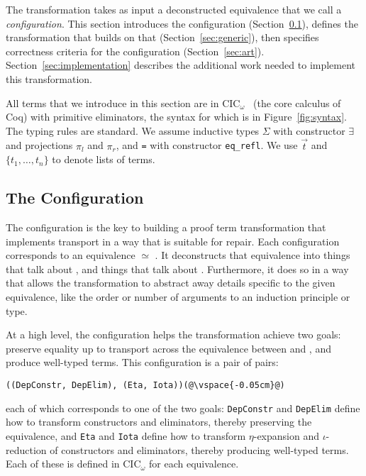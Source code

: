 
The transformation takes as input a deconstructed equivalence that we call a \textit{configuration}.
This section introduces the configuration (Section~\ref{sec:configurable}),
defines the transformation that builds on that (Section~\ref{sec:generic}),
then specifies correctness criteria for the configuration (Section~\ref{sec:art}).
Section~\ref{sec:implementation} describes the additional work needed to implement this transformation.

All terms that we introduce in this section are in CIC$_{\omega}$~\cite{coquand:inria-00076024, inductive} (the core calculus of Coq) with primitive eliminators,
the syntax for which is in Figure~\ref{fig:syntax}.
The typing rules are standard.
We assume inductive types $\Sigma$ with constructor $\exists$ and projections $\pi_l$ and $\pi_r$,
and \lstinline{=} with constructor \lstinline{eq_refl}.
We use $\vec{t}$ and $\{t_1, \ldots, t_n\}$ to denote lists of terms.

\subsection{The Configuration}
\label{sec:configurable}

The configuration is the key to building a proof term transformation that implements transport in a way that is suitable for repair.
Each configuration corresponds to an equivalence \A $\simeq$ \B.
It deconstructs that equivalence into things that talk about \A, and things that talk about \B.
Furthermore, it does so in a way that allows the transformation to abstract away details
specific to the given equivalence, like the order or number of arguments to an induction principle or type.

At a high level, the configuration helps the transformation achieve two goals: preserve equality up to transport across the equivalence 
between \A and \B, and produce well-typed terms.
This configuration is a pair of pairs:

\begin{lstlisting}
((DepConstr, DepElim), (Eta, Iota))(@\vspace{-0.05cm}@)
\end{lstlisting}
each of which corresponds to one of the two goals:
\lstinline{DepConstr} and \lstinline{DepElim} define how to transform constructors and eliminators, thereby preserving the equivalence, and 
\lstinline{Eta} and \lstinline{Iota} define how to transform $\eta$-expansion and $\iota$-reduction of constructors and eliminators, thereby producing well-typed terms.
Each of these is defined in CIC$_{\omega}$ for each equivalence.

